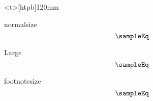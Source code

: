 \clearpage
\begin{minipage}<t>[htpb]{120mm}
		\vspace*{10mm}
			{\normalsize  normalsize 
				\[ \sampleEq \]\par}

			{\Large  Large 
				\[ \sampleEq \]\par}

			{\footnotesize  footnotesize
				\[ \sampleEq \]\par}
\end{minipage}



\endinput